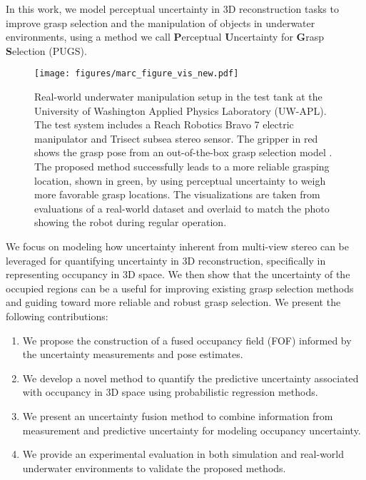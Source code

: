 In this work, we model perceptual uncertainty in 3D reconstruction tasks to improve grasp selection and the manipulation of objects in underwater environments, using a method we call \textbf{P}erceptual \textbf{U}ncertainty for \textbf{G}rasp \textbf{S}election (PUGS). 
\begin{figure}[t!]
    \centering
    \texttt{[image: figures/marc\_figure\_vis\_new.pdf]}
    \caption{Real-world underwater manipulation setup in the test tank at the University of Washington Applied Physics Laboratory (UW-APL). 
    The test system includes a Reach Robotics Bravo 7 electric manipulator and Trisect subsea stereo sensor.
    The gripper in red shows the grasp pose from an out-of-the-box grasp selection model \cite{player_real-time_2023}.
    The proposed method successfully leads to a more reliable grasping location, shown in green, by using perceptual uncertainty to weigh more favorable grasp locations.
    The visualizations are taken from evaluations of a real-world dataset and overlaid to match the photo showing the robot during regular operation.
    }
    \label{fig:hh101}
    \vspace{-3mm}
\end{figure}
We focus on modeling how uncertainty inherent from multi-view stereo can be leveraged for quantifying uncertainty in 3D reconstruction, specifically in representing occupancy in 3D space.
We then show that the uncertainty of the occupied regions can be a useful for improving existing grasp selection methods and guiding toward more reliable and robust grasp selection. We present the following contributions:
\begin{enumerate}
    \item We propose the construction of a fused occupancy field (FOF) informed by the uncertainty measurements and pose estimates. %
    \item We develop a novel method to quantify the predictive uncertainty associated with occupancy in 3D space using probabilistic regression methods.
    \item We present an uncertainty fusion method to combine information from measurement and predictive uncertainty for modeling occupancy uncertainty.
    \item We provide an experimental evaluation in both simulation and real-world underwater environments to validate the proposed methods.
\end{enumerate}
